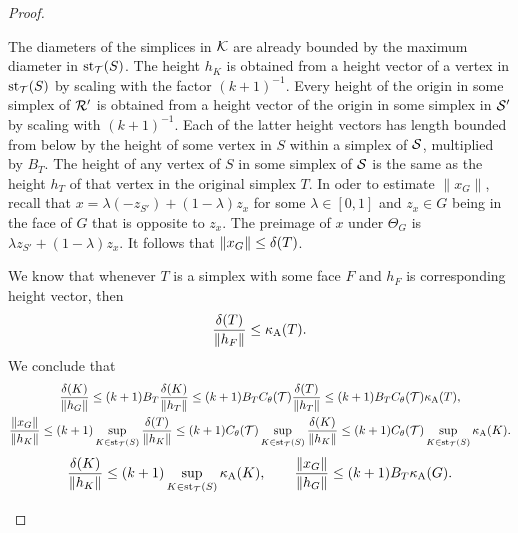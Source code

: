 \documentclass[10pt,a4paper]{article}
\begin{document}
\begin{proof}
\begin{itemize}
        The diameters of the simplices in ${\mathcal K}$ are already bounded by the maximum diameter in $\operatorname{st}_{{\mathcal T}}(S)$.
        The height $h_{K}$ is obtained from a height vector of a vertex in $\operatorname{st}_{{\mathcal T}}(S)$ by scaling with the factor $(k+1)^{-1}$.
        Every height of the origin in some simplex of ${\mathcal R}'$ is obtained from a height vector of the origin in some simplex in ${\mathcal S}'$
        by scaling with $(k+1)^{-1}$. Each of the latter height vectors has length bounded from below by the height of some vertex in $S$ within a simplex of ${\mathcal S}$, multiplied by $B_{T}$. The height of any vertex of $S$ in some simplex of ${\mathcal S}$ is the same as the height $h_T$ of that vertex in the original simplex $T$. 
        In oder to estimate $\|x_{G}\|$, recall that $x = \lambda (-z_{S'}) + (1-\lambda) z_{x}$ for some $\lambda \in [0,1]$ and $z_{x} \in G$
        being in the face of $G$ that is opposite to $z_{x}$. The preimage of $x$ under $\Theta_{{G}}$ is $\lambda z_{S'} + (1-\lambda) z_{x}$. 
        It follows that $\|x_{G}\| \leq {\delta}(T)$. 
        
        We know that whenever $T$ is a simplex with some face $F$ and $h_F$ is corresponding height vector, then 
        \begin{align*}
            \frac{{\delta}(T)}{ \|h_{F}\|}
            \leq  
            \kappa_{\rm A}(T)
            .
        \end{align*}
        We conclude that 
        \begin{gather*}
            \frac{ \diam(K) }{ \| h_{{G}} \| }
            \leq 
            (k+1)B_{T}
            \frac{ \diam(K) }{ \| h_{T} \| }
            \leq 
            (k+1)B_{T}
            \diameterratio(\calT)
            \frac{ \diam(T) }{ \| h_{T} \| }
            \leq 
            (k+1)B_{T}
            \diameterratio(\calT)
            \aspectratio(T) %
            ,
            \\
            \frac{ \| x_{G} \| }{ \| h_{K} \| }
            \leq 
            (k+1)
            \sup_{ K \in \patch_{\calT}(S) }
            \frac{ \diam(T) }{ \| h_{K} \| }
            \leq 
            (k+1)
            \diameterratio(\calT)
            \sup_{ K \in \patch_{\calT}(S) }
            \frac{ \diam(K) }{ \| h_{K} \| }
            \leq 
            (k+1)
            \diameterratio(\calT)
            \sup_{ K \in \patch_{\calT}(S) }
            \aspectratio(K) %
            .
        \end{gather*}
        \begin{gather*}
            \frac{ \diam(K) }{ \| h_{{K}} \| }
            \leq 
            (k+1)
            \sup_{ K \in \patch_{\calT}(S) }
            \aspectratio(K) %
            ,
            \qquad 
            \frac{ \| x_{G} \| }{ \| h_{G} \| }
            \leq 
            (k+1)B_{T}
            \aspectratio({G}) %
            .
        \end{gather*}


\end{itemize}
\end{proof}
\end{document}
